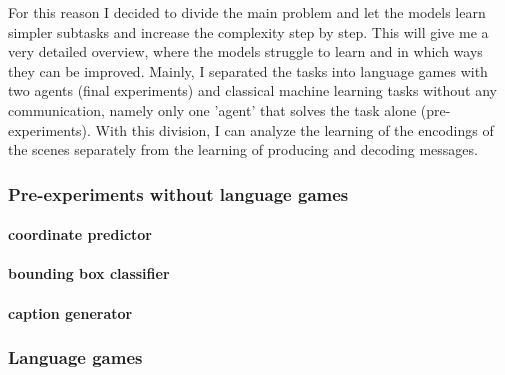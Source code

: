 For this reason I decided to divide the main problem and let the models learn simpler subtasks and increase the complexity step by step. This will give me a very detailed overview, where the models struggle to learn and in which ways they can be improved. Mainly, I separated the tasks into language games with two agents (final experiments) and classical machine learning tasks without any communication, namely only one 'agent' that solves the task alone (pre-experiments). With this division, I can analyze the learning of the encodings of the scenes separately from the learning of producing and decoding messages.

\subsubsection{Pre-experiments without language games}
\paragraph{coordinate predictor}
\paragraph{bounding box classifier}

\paragraph{caption generator}
\subsubsection{Language games}